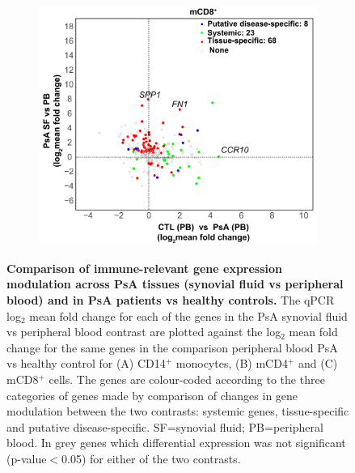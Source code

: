 \begin{figure}[htbp]
\begin{subfigure}{0.45\textwidth}
\caption{\textbf{}}
\end{subfigure}\\
\begin{subfigure}{0.45\textwidth}
\centering
\includegraphics[width=\textwidth]{./Results3/pdfs/PSA_array_correlation_CD8_FC_HVPsA_vs_SFPBPsA}
\caption{\textbf{}}
\end{subfigure}
\caption[Comparison of immune-relevant gene expression modulation across PsA tissues (synovial fluid vs peripheral blood) and in PsA patients vs healthy controls.]{\textbf{Comparison of immune-relevant gene expression modulation across PsA tissues (synovial fluid vs peripheral blood) and in PsA patients vs healthy controls.} The qPCR log${_2}$ mean fold change for each of the genes in the PsA synovial fluid vs peripheral blood contrast are plotted against the log${_2}$ mean fold change for the same genes in the comparison peripheral blood PsA vs healthy control for (A) CD14$^+$ monocytes, (B) mCD4$^+$ and (C) mCD8$^+$ cells. The genes are colour-coded according to the three categories of genes made by comparison of changes in gene modulation between the two contrasts: systemic genes, tissue-specific and putative disease-specific. SF=synovial fluid; PB=peripheral blood. In grey genes which differential expression was not significant (p-value$<$0.05) for either of the two contrasts.}
\label{figure:PSA_PCR_array_HC_FC_correlation}
\end{figure} 



